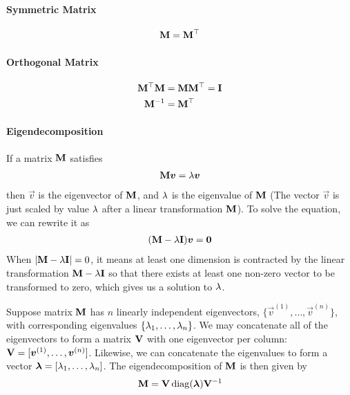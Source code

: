 \paragraph{Symmetric Matrix}

\begin{align*}
	\mathbf{M}=\mathbf{M}{}^\top
\end{align*}

\paragraph{Orthogonal Matrix}

\begin{align*}
	\mathbf{M}{}^\top\mathbf{M}&=\mathbf{M}\mathbf{M}{}^\top=\mathbf{I} \\
	\mathbf{M}^{-1}&=\mathbf{M}{}^\top
\end{align*}

\paragraph{Eigendecomposition}

If a matrix $\mathbf{M}$ satisfies
\begin{align*}
	\mathbf{M}\boldsymbol{v}=\lambda\boldsymbol{v}
\end{align*}
then $\vec{v}$ is the eigenvector of $\mathbf{M}$, and $\lambda$ is the eigenvalue of $\mathbf{M}$ (The vector $\vec{v}$ is just scaled by value $\lambda$ after a linear transformation $\mathbf{M}$). To solve the equation, we can rewrite it as
\begin{align*}
	(\mathbf{M}-\lambda\mathbf{I})\boldsymbol{v}=\boldsymbol{0}
\end{align*}
When $\left\vert \mathbf{M}-\lambda\mathbf{I} \right\vert=0$, it means at least one dimension is contracted by the linear transformation $\mathbf{M}-\lambda\mathbf{I}$ so that there exists at least one non-zero vector to be transformed to zero, which gives us a solution to $\lambda$.

Suppose matrix $\mathbf{M}$ has $n$ linearly independent eigenvectors, $\{\vec{v}^{(1)},\dotsc,\vec{v}^{(n)}\}$, with corresponding eigenvalues $\{\lambda_1,\dotsc,\lambda_n\}$. We may concatenate all of the eigenvectors to form a matrix $\mathbf{V}$ with one eigenvector per column: $\mathbf{V}=[\boldsymbol{v}^{(1)},\dotsc,\boldsymbol{v}^{(n)}]$. Likewise, we can concatenate the eigenvalues to form a vector $\boldsymbol{\lambda}=[\lambda_1,\dotsc,\lambda_n]$. The eigendecomposition of $\mathbf{M}$ is then given by
\begin{align*}
	\mat{M}=\mat{V}\diag(\vec{\la})\mat{V}\inv
\end{align*}

